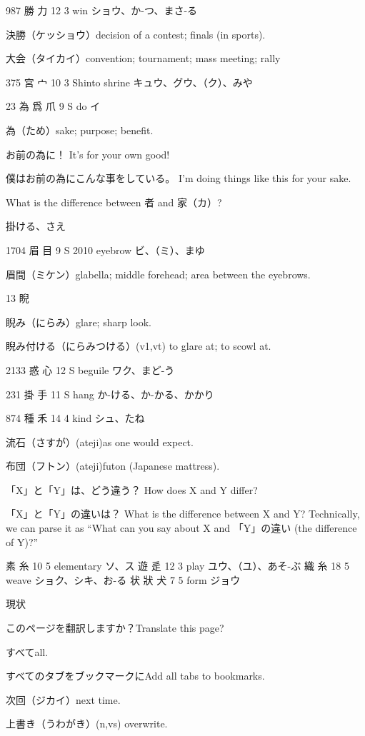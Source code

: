 987	勝		力	12	3		win	ショウ、か-つ、まさ-る

決勝（ケッショウ）decision of a contest; finals (in sports).

大会（タイカイ）convention; tournament; mass meeting; rally

375	宮		宀	10	3		Shinto shrine	キュウ、グウ、（ク）、みや

23	為	爲	爪	9	S		do	イ

為（ため）sake; purpose; benefit.

お前の為に！
It's for your own good!

僕はお前の為にこんな事をしている。
I'm doing things like this for your sake.

What is the difference between 者 and 家（カ）?

掛ける、さえ

1704	眉		目	9	S	2010	eyebrow	ビ、（ミ）、まゆ

眉間（ミケン）glabella; middle forehead; area between the eyebrows.

13 睨

睨み（にらみ）glare; sharp look.

睨み付ける（にらみつける）(v1,vt) to glare at; to scowl at.

2133	惑		心	12	S		beguile	ワク、まど-う

231	掛		手	11	S		hang	か-ける、か-かる、かかり

874	種		禾	14	4		kind	シュ、たね

流石（さすが）(ateji)as one would expect.

布団（フトン）(ateji)futon (Japanese mattress).

「X」と「Y」は、どう違う？
How does X and Y differ?

「X」と「Y」の違いは？
What is the difference between X and Y?
Technically, we can parse it as
``What can you say about X and 「Y」の違い (the difference of Y)?''

素  糸 10 5  elementary ソ、ス
遊  辵 12 3  play ユウ、（ユ）、あそ-ぶ
織  糸 18 5  weave ショク、シキ、お-る
状 狀 犬 7 5  form ジョウ

現状

このページを翻訳しますか？Translate this page?

すべてall.

すべてのタブをブックマークにAdd all tabs to bookmarks.

次回（ジカイ）next time.

上書き（うわがき）(n,vs) overwrite.


